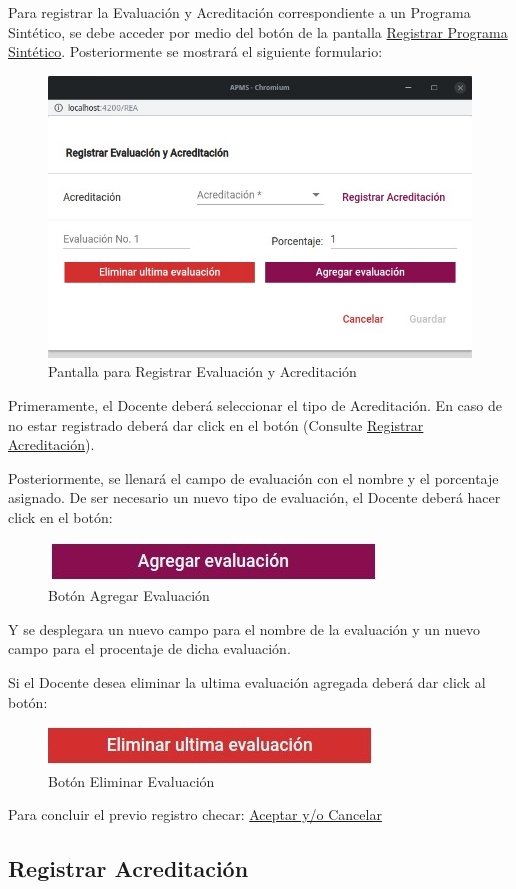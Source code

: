 Para registrar la Evaluación y Acreditación correspondiente a un Programa Sintético, se debe acceder por medio del botón  de la pantalla \hyperlink{RegistrarPS}{Registrar Programa Sintético}. Posteriormente se mostrará el siguiente formulario:


\begin{figure}[!h]
    \centering
    \hypertarget{RegEyA}{\includegraphics[width=0.5\linewidth]{images/SP6/8.jpeg}}
    \caption{Pantalla para Registrar Evaluación y Acreditación}
\end{figure}

Primeramente, el Docente deberá seleccionar el tipo de Acreditación. En caso de no estar registrado deberá dar click en el botón (Consulte \hyperlink{RegA}{Registrar Acreditación}).

Posteriormente, se llenará el campo de evaluación con el nombre y el porcentaje asignado. De ser necesario un nuevo tipo de evaluación, el Docente deberá hacer click en el botón:

\begin{figure}[!h]
    \centering
    \includegraphics[width=0.3\linewidth]{images/SP6/BotonEval.jpeg}
    \caption{Botón Agregar Evaluación}
\end{figure}

Y se desplegara un nuevo campo para el nombre de la evaluación y un nuevo campo para el procentaje de dicha evaluación.

Si el Docente desea eliminar la ultima evaluación agregada deberá dar click al botón:


\begin{figure}[!h]
    \centering
    \includegraphics[width=0.3\linewidth]{images/SP6/BotonEliEval.jpeg}
    \caption{Botón Eliminar Evaluación}
\end{figure}
Para concluir el previo registro checar:
\hyperlink{AceptarCancelar}{Aceptar y/o Cancelar}
\pagebreak
\hypertarget{RegA}{\subsection{Registrar Acreditación}}

